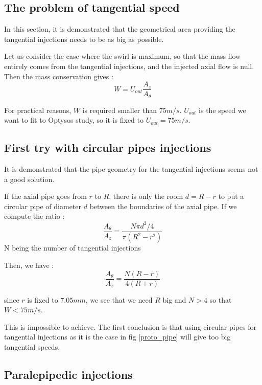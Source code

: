 \subsection{The problem of tangential speed}

In this section, it is demonstrated that the geometrical area providing the tangential injections needs to be as big as possible.

Let us consider the case where the swirl is maximum, so that the mass flow entirely comes from the tangential injections, and the injected axial flow is null. Then the mass conservation gives :
\begin{equation}
W=U_{out} \frac{A_{z}}{A_{\theta}}
\end{equation}


For practical reasons, $W$ is required smaller than $75m/s$. $U_{out}$ is the speed we want to fit to Optysos study, so it is fixed to $U_{out}=75m/s$. 

\subsection{First try with circular pipes injections}

It is demonstrated that the pipe geometry for the tangential injections seems not a good solution.

If the axial pipe goes from $r$ to $R$, there is only the room $d=R-r$ to put a circular pipe of diameter $d$ between the boundaries of the axial pipe.
If we compute the ratio :
\begin{equation}
\frac{A_{\theta}}{A_{z}}=\frac{N\pi d^2/4}{\pi (R^2-r^2)}
\end{equation} N being the number of tangential injections

Then, we  have :
\begin{equation}
 \frac{A_{\theta}}{A_{z}}=\frac{N(R-r)}{4 (R+r)}
\end{equation}

 since $r$ is fixed to $7.05mm$, we see that we need $R$ big and $N>4$  so that $W<75m/s$.
 
 This is impossible to achieve. The first conclusion is that using circular pipes for tangential injections as it is the case in fig \ref{proto_pipe} will give too big tangential speeds.
 
 \subsection{Paralepipedic injections }

